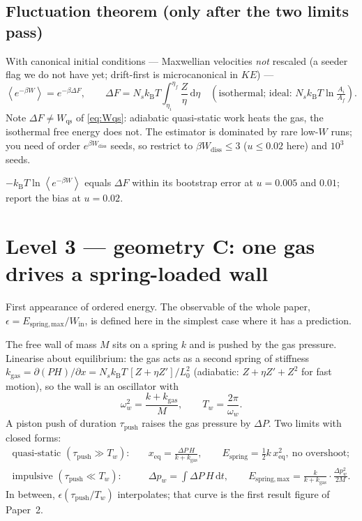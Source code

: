 \documentclass[11pt,a4paper]{article}
\newcommand{\kT}{k_{\mathrm B}T}
\newcommand{\avg}[1]{\left\langle #1 \right\rangle}
\newcommand{\dd}{\mathrm{d}}
\begin{document}
\subsection{Fluctuation theorem (only after the two limits pass)}
With canonical initial conditions --- Maxwellian velocities \emph{not} rescaled (a seeder flag we do not have yet; drift-first is microcanonical in $KE$) ---
\begin{equation}
\avg{e^{-\beta W}} = e^{-\beta\Delta F},\qquad
\Delta F = N_s\kT\int_{\eta_i}^{\eta_f}\frac{Z}{\eta}\,\dd\eta
\quad(\text{isothermal; ideal: }N_s\kT\ln\tfrac{A_i}{A_f}).
\label{eq:jarz}
\end{equation}
Note $\Delta F \ne W_{\mathrm{qs}}$ of \eqref{eq:Wqs}: adiabatic quasi-static work heats the gas, the isothermal free energy does not. The estimator is dominated by rare low-$W$ runs; you need of order $e^{\beta W_{\mathrm{diss}}}$ seeds, so restrict to $\beta W_{\mathrm{diss}} \le 3$ ($u \le 0.02$ here) and $10^3$ seeds.
\begin{pass}
$-\kT\ln\avg{e^{-\beta W}}$ equals $\Delta F$ within its bootstrap error at $u = 0.005$ and $0.01$; report the bias at $u = 0.02$.
\end{pass}

\section{Level 3 --- geometry C: one gas drives a spring-loaded wall}

\begin{why}
First appearance of ordered energy. The observable of the whole paper, $\epsilon = E_{\mathrm{spring,max}}/W_{\mathrm{in}}$, is defined here in the simplest case where it has a prediction.
\end{why}

The free wall of mass $M$ sits on a spring $k$ and is pushed by the gas pressure. Linearise about equilibrium: the gas acts as a second spring of stiffness $k_{\mathrm{gas}} = \partial(PH)/\partial x = N_s\kT\,[Z + \eta Z']/L_0^2$ (adiabatic: $Z + \eta Z' + Z^2$ for fast motion), so the wall is an oscillator with
\begin{equation}
\omega_w^2 = \frac{k + k_{\mathrm{gas}}}{M},\qquad T_w = \frac{2\pi}{\omega_w}.
\label{eq:omegaw}
\end{equation}
A piston push of duration $\tau_{\mathrm{push}}$ raises the gas pressure by $\Delta P$. Two limits with closed forms:
\begin{align}
\text{quasi-static }(\tau_{\mathrm{push}} \gg T_w):&\quad x_{\mathrm{eq}} = \frac{\Delta P\,H}{k + k_{\mathrm{gas}}},\qquad E_{\mathrm{spring}} = \tfrac12 k\,x_{\mathrm{eq}}^2,\ \text{no overshoot;}\\
\text{impulsive }(\tau_{\mathrm{push}} \ll T_w):&\quad \Delta p_w = \int \Delta P\,H\,\dd t,\qquad E_{\mathrm{spring,max}} = \frac{k}{k + k_{\mathrm{gas}}}\cdot\frac{\Delta p_w^2}{2M}.
\label{eq:Climits}
\end{align}
In between, $\epsilon(\tau_{\mathrm{push}}/T_w)$ interpolates; that curve is the first result figure of Paper~2.
\end{document}
